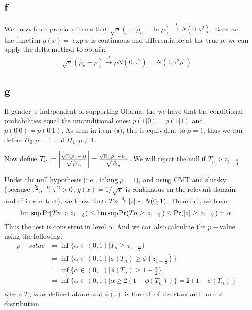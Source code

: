 \documentclass[12pt]{paper}
\begin{document}
\subsection*{f}

We know from previous items that $\sqrt{n}(\ln{\hat{\rho}_n}-\ln{\rho})\overset{d}{\to}N(0,\tau^2)$. Because the function $g(x)=\exp{x}$ is continuous and differentiable at the true $\rho$, we can apply the delta method to obtain:
\begin{equation}
\begin{split}
\sqrt{n}(\hat{\rho}_n-\rho)\overset{d}{\to}\rho N(0,\tau^2)=N(0,\tau^2\rho^2)
\end{split}
\end{equation}

\subsection*{g}

If gender is independent of supporting Obama, the we have that the conditional probabilities equal the unconditional ones: $p(1|0)=p(1|1)$ and $p(0|0)=p(0|1)$. As seen in item (a), this is equivalent to $\rho=1$, thus we can define $H_0: \rho=1$ and $H_1:\rho\ne 1$.

Now define $T_n:= \left \lvert \frac{\sqrt{n}(\hat{\rho}_n-1)}{\sqrt{\hat{\tau^2}_n}} \right \rvert=\frac{\sqrt{n}(\left \lvert \hat{\rho}_n-1 \right \rvert)}{\sqrt{\hat{\tau^2}_n}}$. We will reject the null if $T_n>z_{1-\frac{\alpha}{2}}$.

Under the null hypothesis (i.e., taking  $\rho=1$), and using CMT and slutsky (because $\hat{\tau^2}_n\overset{p}{\to} \tau^2>0$, $g(x)=1/\sqrt{x}$ is continuous on the relevant domain, and $\tau^2$ is constant), we know that: $Tn\overset{d}{\to}\left \lvert z \right \rvert\sim N(0,1)$. Therefore, we have:
\begin{equation}
 \limsup{\Pr(Tn> z_{1-\frac{\alpha}{2}})}\le \limsup{\Pr(Tn\ge z_{1-\frac{\alpha}{2}})}\le \Pr(\left \lvert z \right \rvert\ge z_{1-\frac{\alpha}{2}})=\alpha.
\end{equation}
\noindent Thus the test is consistent in level $\alpha$. And we can also calculate the $p-$value using the following:
\begin{equation}
\begin{split}
p-value&=\inf{\{\alpha\in(0,1)|T_n\ge z_{1-\frac{\alpha}{2}}\}}\\
&=\inf{\{\alpha\in(0,1)|\phi(T_n)\ge \phi(z_{1-\frac{\alpha}{2}})\}}\\
&=\inf{\{\alpha\in(0,1)|\phi(T_n)\ge 1-\frac{\alpha}{2}\}}\\
&=\inf{\{\alpha\in(0,1)|\alpha\ge 2(1-\phi(T_n))\}}=2(1-\phi(T_n))\\
\end{split}
\end{equation}
\noindent where $T_n$ is as defined above and $\phi(.)$ is the cdf of the standard normal distribution.
\end{document}
